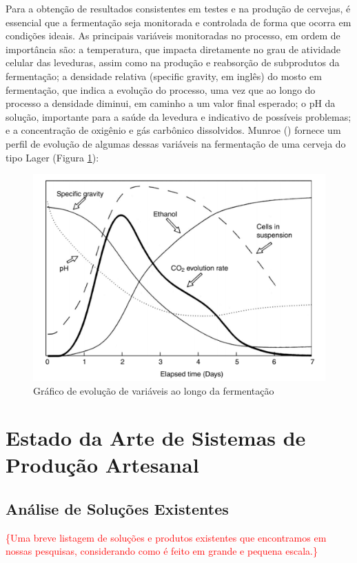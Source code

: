 Para a obtenção de resultados consistentes em testes e na produção de cervejas, é
essencial que a fermentação seja monitorada e controlada de forma que ocorra em
condições ideais. As principais variáveis monitoradas no processo, em ordem de
importância são: a temperatura, que impacta diretamente no grau de atividade
celular das leveduras, assim como na produção e reabsorção de subprodutos da
fermentação; a densidade relativa (specific gravity, em inglês) do mosto em
fermentação, que indica a evolução do processo, uma vez que ao longo do processo
a densidade diminui, em caminho a um valor final esperado; o pH da solução,
importante para a saúde da levedura e indicativo de possíveis problemas; e a
concentração de oxigênio e gás carbônico dissolvidos. Munroe () fornece um
perfil de evolução de algumas dessas variáveis na fermentação de uma cerveja do
tipo Lager (Figura \ref{fig:variaveis_fermentacao}):

\begin{figure}[H]
    \centering
    \includegraphics[scale=0.40]{figuras/contexto/variaveis_fermentacao.PNG}
    \caption{Gráfico de evolução de variáveis ao longo da fermentação \cite{FermentationMunroe} }
    \label{fig:variaveis_fermentacao}
\end{figure}

\section{Estado da Arte de Sistemas de Produção Artesanal}

\subsection{Análise de Soluções Existentes}

\textcolor{red}{\{Uma breve listagem de soluções e produtos existentes que encontramos em nossas pesquisas, considerando como é feito em grande e pequena escala.\}}
